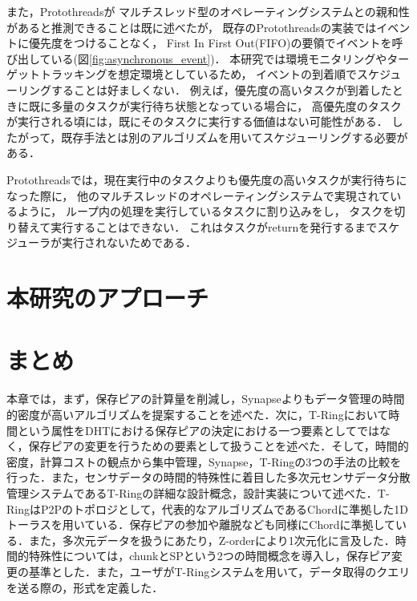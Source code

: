 また，Protothreadsが
マルチスレッド型のオペレーティングシステムとの親和性があると推測できることは既に述べたが，
既存のProtothreadsの実装ではイベントに優先度をつけることなく，
First In First Out(FIFO)の要領でイベントを呼び出している(図\ref{fig:asynchronous_event})．
本研究では環境モニタリングやターゲットトラッキングを想定環境としているため，
イベントの到着順でスケジューリングすることは好ましくない．
例えば，優先度の高いタスクが到着したときに既に多量のタスクが実行待ち状態となっている場合に，
高優先度のタスクが実行される頃には，既にそのタスクに実行する価値はない可能性がある．
したがって，既存手法とは別のアルゴリズムを用いてスケジューリングする必要がある．



Protothreadsでは，現在実行中のタスクよりも優先度の高いタスクが実行待ちになった際に，
他のマルチスレッドのオペレーティングシステムで実現されているように，
ループ内の処理を実行しているタスクに割り込みをし，
タスクを切り替えて実行することはできない．
これはタスクがreturnを発行するまでスケジューラが実行されないためである．


\section{本研究のアプローチ}


\section{まとめ}
本章では，まず，保存ピアの計算量を削減し，Synapseよりもデータ管理の時間的密度が高いアルゴリズムを提案することを述べた．次に，T-Ringにおいて時間という属性をDHTにおける保存ピアの決定における一つ要素としてではなく，保存ピアの変更を行うための要素として扱うことを述べた．そして，時間的密度，計算コストの観点から集中管理，Synapse，T-Ringの3つの手法の比較を行った．また，センサデータの時間的特殊性に着目した多次元センサデータ分散管理システムであるT-Ringの詳細な設計概念，設計実装について述べた．T-RingはP2Pのトポロジとして，代表的なアルゴリズムであるChordに準拠した1Dトーラスを用いている．保存ピアの参加や離脱なども同様にChordに準拠している．また，多次元データを扱うにあたり，Z-orderにより1次元化に言及した．時間的特殊性については，chunkとSPという2つの時間概念を導入し，保存ピア変更の基準とした．また，ユーザがT-Ringシステムを用いて，データ取得のクエリを送る際の，形式を定義した．



